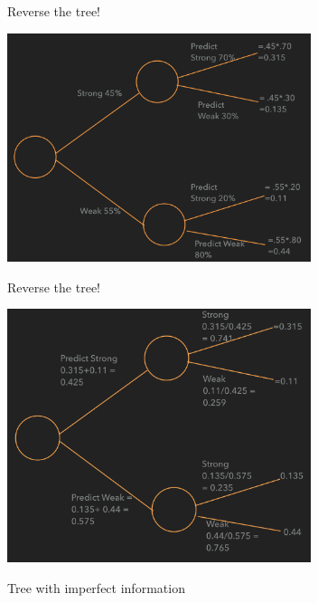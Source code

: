 \documentclass{beamer}\usepackage[]{graphicx}\usepackage[]{color}
\begin{document}
\begin{darkframes}
\begin{frame}[fragile]{Reverse the tree!}
      \begin{center}
        \includegraphics[width=3.5in]{BeforeFlip} \\
      \end{center}

    \end{frame}


    \begin{frame}[fragile]{Reverse the tree!}

      \begin{center}
        \includegraphics[width=3.5in]{AfterFlip} \\
      \end{center}

    \end{frame}


    \begin{frame}[fragile]{Tree with imperfect information}
       

\end{frame}
\end{darkframes}
\end{document}
